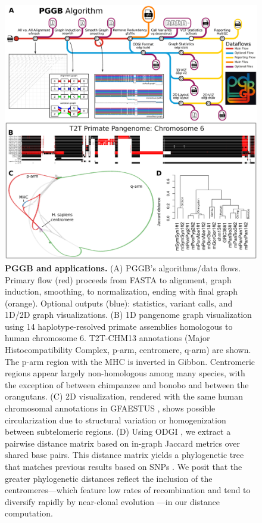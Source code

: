 \documentclass[pdflatex,mathphys]{jnl}%
\theoremstyle{thmstyleone}%
\theoremstyle{thmstyletwo}%
\theoremstyle{thmstylethree}%
\begin{document}
\begin{figure}[htbp!]
	\includegraphics[width=\linewidth]{fig/figure1.pdf}
	\caption{
      \textbf{PGGB and applications.}
      (A) PGGB’s algorithms/data flows.
      Primary flow (red) proceeds from FASTA to alignment, graph induction, smoothing, to normalization, ending with final graph (orange). Optional outputs (blue): statistics, variant calls, and 1D/2D graph visualizations.
      (B) 1D pangenome graph visualization using 14 haplotype-resolved primate assemblies homologous to human chromosome 6.
      T2T-CHM13 annotations (Major Histocompatibility Complex, p-arm, centromere, q-arm) are shown.
      The p-arm region with the MHC is inverted in Gibbon.
      Centromeric regions appear largely non-homologous among many species, with the exception of between chimpanzee and bonobo and between the orangutans.
      (C) 2D visualization, rendered with the same human chromosomal annotations in GFAESTUS \cite{Fischer_2022}, shows possible circularization due to structural variation or homogenization between subtelomeric regions.
      (D) Using ODGI \cite{Guarracino_odgi_2022}, we extract a pairwise distance matrix based on in-graph Jaccard metrics over shared base pairs.
      This distance matrix yields a phylogenetic tree that matches previous results based on SNPs \cite{Cagan_2016}.
      We posit that the greater phylogenetic distances reflect the inclusion of the centromeres---which feature low rates of recombination and tend to diversify rapidly by near-clonal evolution \cite{Logsdon2021}---in our distance computation.
    }
	\label{fig:pggb}
\end{figure}
\end{document}
